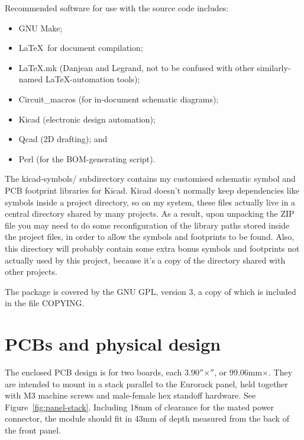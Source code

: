 Recommended software for use with the source code includes:
\begin{itemize}
  \item GNU Make;
  \item \LaTeX\ for document compilation;
  \item LaTeX.mk (Danjean and Legrand, not to be confused with other
    similarly-named \LaTeX-automation tools);
  \item Circuit\_macros (for in-document schematic diagrams);
  \item Kicad (electronic design automation);
  \item Qcad (2D drafting); and
  \item Perl (for the BOM-generating script).
\end{itemize}

The kicad-symbols/ subdirectory contains my customised schematic symbol and
PCB footprint libraries for Kicad.  Kicad doesn't normally keep dependencies
like symbols inside a project directory, so on my system, these files
actually live in a central directory shared by many projects.  As a result,
upon unpacking the ZIP file you may need to do some reconfiguration of the
library paths stored inside the project files, in order to allow the symbols
and footprints to be found.  Also, this directory will probably contain some
extra bonus symbols and footprints not actually used by this project,
because it's a copy of the directory shared with other projects.

The package is covered by the GNU GPL, version 3, a copy of which is
included in the file COPYING.

\section{PCBs and physical design}

The enclosed PCB design is for two boards, each
3.90$''$\linebreak[0]$\times$$''$, or
99.06mm\linebreak[0]$\times$\linebreak[0]38.10mm.  They are intended to
mount in a stack parallel to the Eurorack panel, held together with M3
machine screws and male-female hex standoff hardware.  See
Figure~\ref{fig:panel-stack}.  Including 18mm of clearance for the mated
power connector, the module should fit in 43mm of depth measured from the
back of the front panel.

